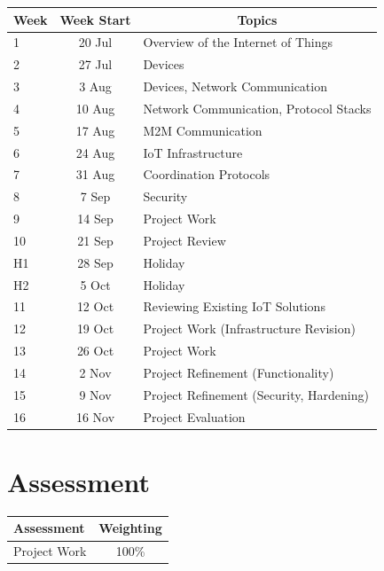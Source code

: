 \documentclass{article}
\begin{document}
\renewcommand{\arraystretch}{1.5}
\begin{tabular}{|l|c|l|}
\hline
 Week & Week Start & \multicolumn{1}{c|}{Topics}             \\ \hline
 1    & 20 Jul     & Overview of the Internet of Things      \\ \hline
 2    & 27 Jul     & Devices                                 \\ \hline
 3    &  3 Aug     & Devices, Network Communication          \\ \hline
 4    & 10 Aug     & Network Communication, Protocol Stacks  \\ \hline
 5    & 17 Aug     & M2M Communication                       \\ \hline
 6    & 24 Aug     & IoT Infrastructure                      \\ \hline
 7    & 31 Aug     & Coordination Protocols                  \\ \hline
 8    &  7 Sep     & Security               		         \\ \hline
 9    & 14 Sep     & Project Work                            \\ \hline
 10   & 21 Sep     & Project Review                          \\ \hline
 H1   & 28 Sep     & Holiday                                 \\ \hline
 H2   &  5 Oct     & Holiday                                 \\ \hline
 11   & 12 Oct     & Reviewing Existing IoT Solutions   	 \\ \hline
 12   & 19 Oct     & Project Work (Infrastructure Revision)  \\ \hline
 13   & 26 Oct     & Project Work							 \\ \hline
 14   &  2 Nov     & Project Refinement (Functionality)      \\ \hline
 15   &  9 Nov     & Project Refinement (Security, Hardening)\\ \hline
 16   & 16 Nov     & Project Evaluation 					 \\ \hline
\end{tabular}

\section*{Assessment}

\begin{tabular}{|l|c|}
\hline
Assessment                  &  Weighting \\ \hline
Project Work                &  100\% \\ \hline
\end{tabular}
\end{document}
